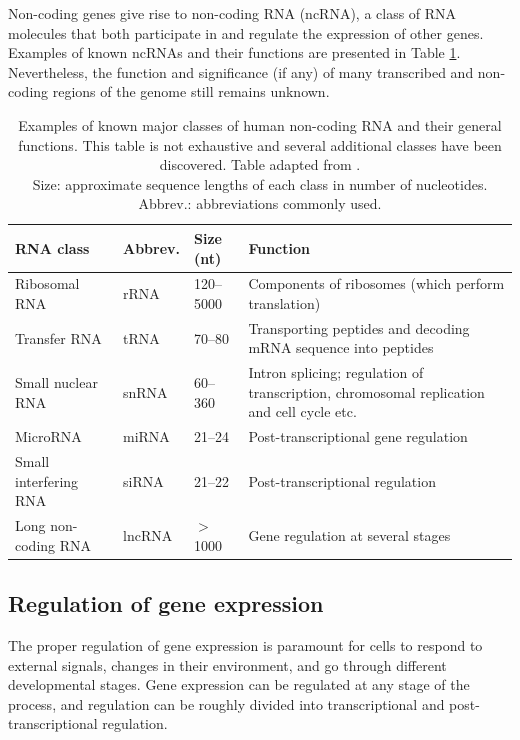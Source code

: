 Non-coding genes give rise to non-coding RNA (ncRNA), a class of RNA molecules
that both participate in and regulate the expression of other genes.
Examples of known ncRNAs and their functions are presented in Table
\ref{table:rnas}. Nevertheless, the function and significance (if any) of many
transcribed and non-coding regions of the genome still remains unknown.

\begin{table}
  \caption{Examples of known major classes of human non-coding RNA and their
  general functions. This table is not exhaustive and several additional classes have
  been discovered. Table adapted from \citep{Strachan2011}. \\
  Size: approximate sequence lengths of each class in number of nucleotides.
  Abbrev.: abbreviations commonly used.}
  \label{table:rnas}
  \centering
  {\fontsize{10pt}{12pt}\selectfont
  \begin{tabular}{ lllp{6cm} }
    \hline
    \textbf{RNA class} & \textbf{Abbrev.} & \textbf{Size (nt)} & \textbf{Function} \\
    \hline
    Ribosomal RNA         & rRNA   & 120--5000  & Components of ribosomes (which perform translation) \\
    Transfer RNA          & tRNA   & 70--80     & Transporting peptides and decoding mRNA sequence into peptides \\
    Small nuclear RNA     & snRNA  & 60--360    & Intron splicing; regulation of transcription, chromosomal replication and cell cycle etc.  \\
    MicroRNA              & miRNA  & 21--24     & Post-transcriptional gene regulation \\
    Small interfering RNA & siRNA  & 21--22     & Post-transcriptional regulation \\
    Long non-coding RNA   & lncRNA & $>$ 1000   & Gene regulation at several stages \\
    \hline
  \end{tabular}
  }
\end{table}




\subsection{Regulation of gene expression}\label{regulation-of-gene-expression}

The proper regulation of gene expression is paramount for cells
to respond to external signals, changes in their environment, and 
go through different developmental stages. Gene expression can be regulated
at any stage of the process, and regulation can be roughly divided into transcriptional
and post-transcriptional regulation.

